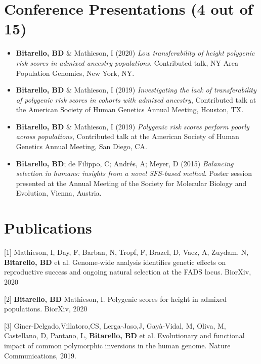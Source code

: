 \documentclass{article}
\begin{document}
\section{Conference Presentations \small (4 out of 15)}

\begin{itemize}
\item \textbf{Bitarello, BD} & Mathieson, I (2020) \emph{Low transferability of height polygenic risk scores in admixed ancestry populations.} Contributed talk, NY Area Population Genomics, New York, NY.

\item \textbf{Bitarello, BD} & Mathieson, I (2019) \emph{Investigating the lack of transferability of polygenic risk scores in cohorts with admixed ancestry}, Contributed talk at the American Society of Human Genetics Annual Meeting, Houston, TX.

\item \textbf{Bitarello, BD} & Mathieson, I (2019) \emph{Polygenic risk scores perform poorly across populations}, Contributed talk at the American Society of Human Genetics Annual Meeting, San Diego, CA.

\item \textbf{Bitarello, BD}; de Filippo, C; Andrés, A; Meyer, D (2015) \emph{Balancing selection in humans: insights from a novel SFS-based method}. Poster session presented at the Annual Meeting of the Society for Molecular Biology and Evolution, Vienna, Austria.


\end{itemize}

 
\section{Publications}


[1] Mathieson, I, Day, F, Barban, N, Tropf, F, Brazel, D, Vaez, A,  Zuydam, N, \textbf{Bitarello, BD} et al. Genome-wide analysis identifies genetic effects on reproductive success and ongoing natural selection at the FADS locus. BiorXiv, 2020


[2] \textbf{Bitarello, BD} Mathieson, I. Polygenic scores for height in admixed populations. BiorXiv, 2020


[3] Giner-Delgado,Villatoro,CS, Lerga-Jaso,J, Gayà-Vidal, M,  Oliva, M,  Castellano, D, Pantano, L,  \textbf{Bitarello, BD} et al. Evolutionary and functional impact of common polymorphic inversions in the human genome. Nature Communications, 2019.
\end{document}
